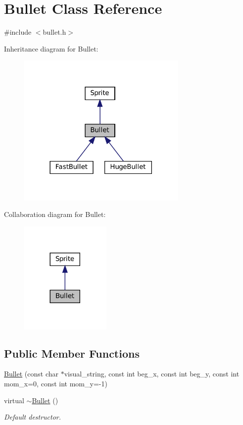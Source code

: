 \hypertarget{classBullet}{}\section{Bullet Class Reference}
\label{classBullet}


{\ttfamily \#include $<$bullet.\+h$>$}



Inheritance diagram for Bullet\+:
\nopagebreak
\begin{figure}[H]
\begin{center}
\leavevmode
\includegraphics[width=234pt]{classBullet__inherit__graph}
\end{center}
\end{figure}


Collaboration diagram for Bullet\+:
\nopagebreak
\begin{figure}[H]
\begin{center}
\leavevmode
\includegraphics[width=125pt]{classBullet__coll__graph}
\end{center}
\end{figure}
\subsection*{Public Member Functions}
\begin{DoxyCompactItemize}
\item 
\hyperlink{classBullet_ae3b4624da4a6bc8e1fdc595cd5d1514a}{Bullet} (const char $\ast$visual\+\_\+string, const int beg\+\_\+x, const int beg\+\_\+y, const int mom\+\_\+x=0, const int mom\+\_\+y=-\/1)
\item 
virtual \hyperlink{classBullet_aaeb5cb41d7db89f49007b08b41f1bfcf}{$\sim$\+Bullet} ()
\begin{DoxyCompactList}\small\item\em Default destructor. \end{DoxyCompactList}\end{DoxyCompactItemize}
